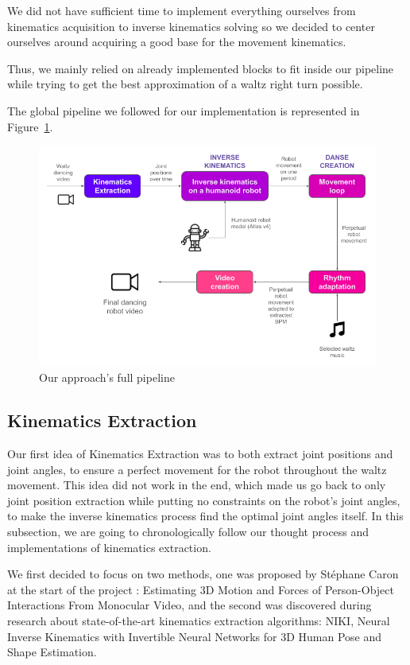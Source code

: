 \documentclass{amsart}
\theoremstyle{definition}
\theoremstyle{plain}
\begin{document}
We did not have sufficient time to implement everything ourselves from kinematics acquisition to inverse kinematics solving so we decided to center ourselves around acquiring a good base for the movement kinematics. 

Thus, we mainly relied on already implemented blocks to fit inside our pipeline while trying to get the best approximation of a waltz right turn possible.

The global pipeline we followed for our implementation is represented in Figure~\ref{fig:pipeline}.

\begin{figure}
  \includegraphics[width = 0.75 \columnwidth]{img/final_solution_pipeline.png}
  \caption{Our approach's full pipeline}\label{fig:pipeline}
\end{figure}

\subsection{Kinematics Extraction}
Our first idea of Kinematics Extraction was to both extract joint positions and joint angles, to ensure a perfect movement for the robot throughout the waltz movement. This idea did not work in the end, which made us go back to only joint position extraction while putting no constraints on the robot's joint angles, to make the inverse kinematics process find the optimal joint angles itself. In this subsection, we are going to chronologically follow our thought process and implementations of kinematics extraction.

We first decided to focus on two methods, one was proposed by Stéphane Caron at the start of the project : Estimating 3D Motion and Forces of Person-Object Interactions From Monocular Video\cite{Li_2019}, and the second was discovered during research about state-of-the-art kinematics extraction algorithms: NIKI, Neural Inverse Kinematics with Invertible Neural Networks for 3D Human Pose and Shape Estimation\cite{li2023niki}.
\end{document}
